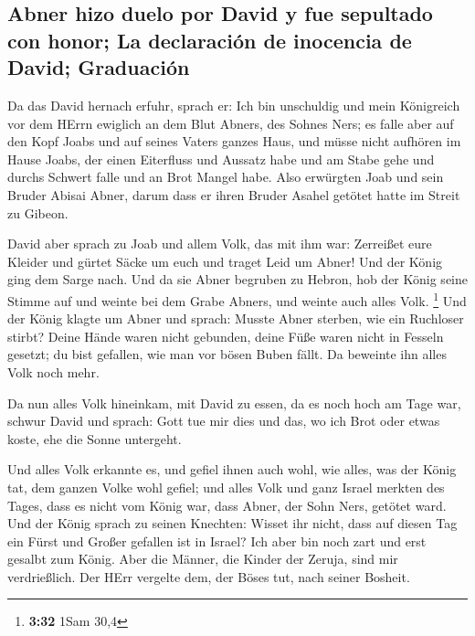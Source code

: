 \hypertarget{abner-hizo-duelo-por-david-y-fue-sepultado-con-honor-la-declaraciuxf3n-de-inocencia-de-david-graduaciuxf3n}{%
\subsection{Abner hizo duelo por David y fue sepultado con honor; La
declaración de inocencia de David;
Graduación}\label{abner-hizo-duelo-por-david-y-fue-sepultado-con-honor-la-declaraciuxf3n-de-inocencia-de-david-graduaciuxf3n}}

 Da das David hernach erfuhr, sprach er: Ich bin
unschuldig und mein Königreich vor dem HErrn ewiglich an dem Blut
Abners, des Sohnes Ners;  es falle aber auf den Kopf
Joabs und auf seines Vaters ganzes Haus, und müsse nicht aufhören im
Hause Joabs, der einen Eiterfluss und Aussatz habe und am Stabe gehe und
durchs Schwert falle und an Brot Mangel habe.  Also
erwürgten Joab und sein Bruder Abisai Abner, darum dass er ihren Bruder
Asahel getötet hatte im Streit zu Gibeon.

 David aber sprach zu Joab und allem Volk, das mit ihm
war: Zerreißet eure Kleider und gürtet Säcke um euch und traget Leid um
Abner! Und der König ging dem Sarge nach.  Und da sie
Abner begruben zu Hebron, hob der König seine Stimme auf und weinte bei
dem Grabe Abners, und weinte auch alles Volk. \footnote{\textbf{3:32}
  1Sam 30,4}  Und der König klagte um Abner und sprach:
Musste Abner sterben, wie ein Ruchloser stirbt?  Deine
Hände waren nicht gebunden, deine Füße waren nicht in Fesseln gesetzt;
du bist gefallen, wie man vor bösen Buben fällt. Da beweinte ihn alles
Volk noch mehr.

 Da nun alles Volk hineinkam, mit David zu essen, da es
noch hoch am Tage war, schwur David und sprach: Gott tue mir dies und
das, wo ich Brot oder etwas koste, ehe die Sonne untergeht.

 Und alles Volk erkannte es, und gefiel ihnen auch wohl,
wie alles, was der König tat, dem ganzen Volke wohl gefiel;
 und alles Volk und ganz Israel merkten des Tages, dass
es nicht vom König war, dass Abner, der Sohn Ners, getötet ward.
 Und der König sprach zu seinen Knechten: Wisset ihr
nicht, dass auf diesen Tag ein Fürst und Großer gefallen ist in Israel?
 Ich aber bin noch zart und erst gesalbt zum König. Aber
die Männer, die Kinder der Zeruja, sind mir verdrießlich. Der HErr
vergelte dem, der Böses tut, nach seiner Bosheit.

